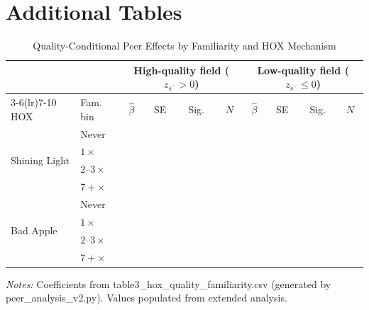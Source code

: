 \documentclass[12pt]{article}
\theoremstyle{definition}
\theoremstyle{remark}
\begin{document}
\section{Additional Tables}
\label{app:tables}

\begin{table}[H]
\centering
\begin{threeparttable}
\caption{Quality-Conditional Peer Effects by Familiarity and HOX Mechanism}
\label{tab:qual_full}
\small
\begin{tabular}{llcccccccc}
\toprule
& & \multicolumn{4}{c}{High-quality field ($z_{\bar{s}^-} > 0$)}
  & \multicolumn{4}{c}{Low-quality field ($z_{\bar{s}^-} \leq 0$)} \\
\cmidrule(lr){3-6}\cmidrule(lr){7-10}
HOX & Fam. bin & $\hat\beta$ & SE & Sig. & $N$ & $\hat\beta$ & SE & Sig. & $N$ \\
\midrule
\multirow{4}{*}{\parbox{2.5cm}{Shining Light}}
& Never    & & & & & & & & \\
& $1\times$& & & & & & & & \\
& $2$--$3\times$ & & & & & & & & \\
& $7+\times$ & & & & & & & & \\
\midrule
\multirow{4}{*}{\parbox{2.5cm}{Bad Apple}}
& Never    & & & & & & & & \\
& $1\times$ & & & & & & & & \\
& $2$--$3\times$ & & & & & & & & \\
& $7+\times$ & & & & & & & & \\
\bottomrule
\end{tabular}
\begin{tablenotes}\small
\item \textit{Notes:} Coefficients from table3\_hox\_quality\_familiarity.csv
(generated by peer\_analysis\_v2.py). Values populated from extended analysis.
\end{tablenotes}
\end{threeparttable}
\end{table}
\end{document}
